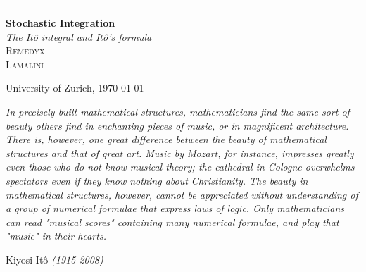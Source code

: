 \documentclass[11pt,a4paper, final]{article}
\theoremstyle{definition}
\begin{document}
\begin{titlepage} %
	
	\raggedleft %
	
	\rule{1pt}{\textheight} %
	\hspace{0.05\textwidth} %
	\parbox[b]{0.75\textwidth}{ %
		
		{\Huge\bfseries Stochastic Integration}\\[2\baselineskip] %
		{\large\textit{The Itô integral and Itô's formula}}\\[4\baselineskip] %
		{\Large\textsc{Remedyx \\
		Lamalini}} %
		
		\vspace{0.5\textheight} %
		
		{\noindent University of Zurich, \today }\\[\baselineskip] %
	}

\end{titlepage}
\newpage 
\thispagestyle{empty}
\null\vfill
\begin{center}
\begin{flushleft}
\textit{\Large In precisely built mathematical structures, mathematicians find the same sort of beauty others find in enchanting pieces of music, or in magnificent architecture. There is, however, one great difference between the beauty of mathematical structures and that of great art. Music by Mozart, for instance, impresses greatly even those who do not know musical theory; the cathedral in Cologne overwhelms spectators even if they know nothing about Christianity. The beauty in mathematical structures, however, cannot be appreciated without understanding of a group of numerical formulae that express laws of logic. Only mathematicians can read "musical scores" containing many numerical formulae, and play that "music" in their hearts. } 
\end{flushleft}
\end{center}
\hfill Kiyosi Itô \textit{(1915-2008)}
\vfill\vfill

\newpage
\end{document}
